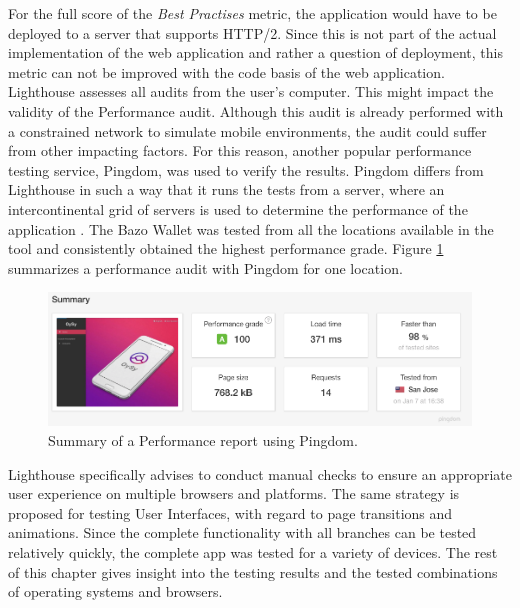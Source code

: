For the full score of the \textit{Best Practises} metric, the application would have to be deployed to a server that supports HTTP/2. Since this is not part of the actual implementation of the web application and rather a question of deployment, this metric can not be improved with the code basis of the web application.
Lighthouse assesses all audits from the user's computer. This might impact the validity of the Performance audit. Although this audit is already performed with a constrained network to simulate mobile environments, the audit could suffer from other impacting factors. For this reason, another popular performance testing service, Pingdom, was used to verify the results. Pingdom differs from Lighthouse in such a way that it runs the tests from a server, where an intercontinental grid of servers is used to determine the performance of the application \cite{pingdom}. The Bazo Wallet was tested from all the locations available in the tool and consistently obtained the highest performance grade. Figure \ref{fig:pingdom} summarizes a performance audit with Pingdom for one location.
\begin{figure}
\centering
\includegraphics[width=1\textwidth]{screenshots/pingdom.png}
\caption{\label{fig:pingdom}Summary of a Performance report using Pingdom.}
\end{figure}

Lighthouse specifically advises to conduct manual checks to ensure an appropriate user experience on multiple browsers and platforms. The same strategy is proposed for testing User Interfaces, with regard to page transitions and animations. 
Since the complete functionality with all branches can be tested relatively quickly, the complete app was tested for a variety of devices. The rest of this chapter gives insight into the testing results and the tested combinations of operating systems and browsers.


